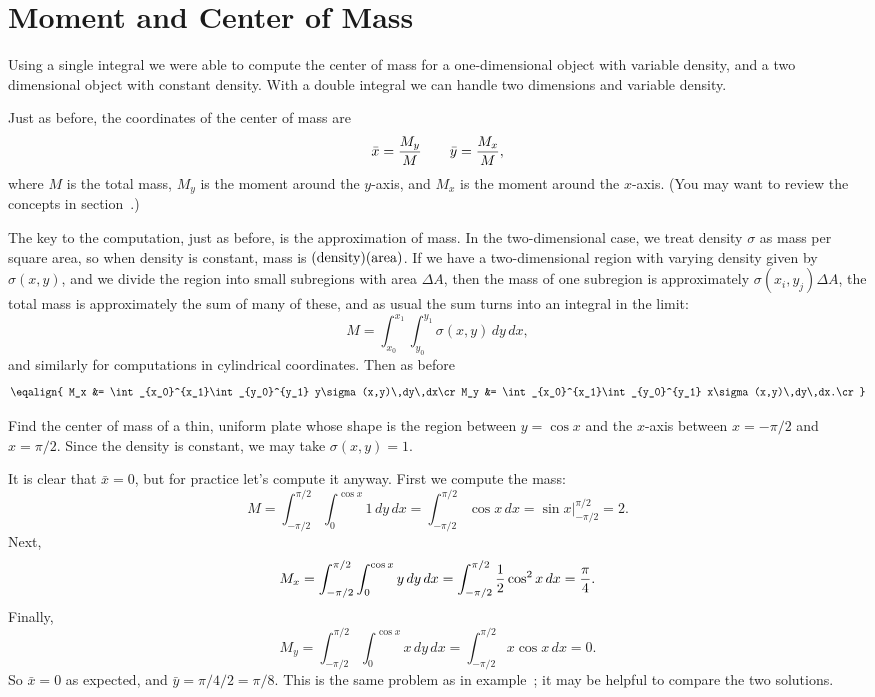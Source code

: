 \section{Moment and Center of Mass}{}{}

Using a single integral we were able to compute the center of mass for
a one-dimensional object with variable density, and a two dimensional
object with constant density. With a double integral we can handle two
dimensions and variable density.

Just as before, the coordinates of the center of mass are
$$\bar x={M_y\over M} \qquad \bar y={M_x\over M},$$
where $M$ is the total mass, $M_y$ is the moment
 around the $y$-axis,
and $M_x$ is the moment around the $x$-axis. (You may want to review
the concepts in section~.) 

The key to the computation, just as before, is the approximation of
mass. In the two-dimensional case, we treat density $\sigma$ as mass
per square area, so when density is constant, mass is 
$(\hbox{density})(\hbox{area})$. If we have a two-dimensional region
with varying density given by $\sigma(x,y)$, and we divide the region
into small subregions with area $\Delta A$, then the mass of one
subregion is approximately $\sigma(x_i,y_j)\Delta A$, the total mass
is approximately the sum of many of these, 
and as usual the sum
turns into an integral in the limit:
$$M=\int_{x_0}^{x_1}\int_{y_0}^{y_1} \sigma(x,y)\,dy\,dx,$$
and similarly for computations in cylindrical coordinates.
Then as before
$$\eqalign{
M_x &= \int_{x_0}^{x_1}\int_{y_0}^{y_1} y\sigma(x,y)\,dy\,dx\cr
M_y &= \int_{x_0}^{x_1}\int_{y_0}^{y_1} x\sigma(x,y)\,dy\,dx.\cr
}$$

\example Find the center of mass of a thin, uniform plate whose shape
is the region between $y=\cos x$ and the $x$-axis between $x=-\pi/2$
and $x=\pi/2$. Since the density is constant, we may take
$\sigma(x,y)=1$. 

It is clear that $\bar x=0$, but for practice let's
compute it anyway. First we compute the mass:
$$
M=\int_{-\pi/2}^{\pi/2} \int_0^{\cos x} 1\,dy\,dx
=\int_{-\pi/2}^{\pi/2} \cos x\,dx
=\left.\sin x\right|_{-\pi/2}^{\pi/2}=2.
$$
Next,
$$
M_x=\int_{-\pi/2}^{\pi/2} \int_0^{\cos x} y\,dy\,dx
=\int_{-\pi/2}^{\pi/2} {1\over2}\cos^2 x\,dx={\pi\over4}.
$$
Finally,
$$
M_y=\int_{-\pi/2}^{\pi/2} \int_0^{\cos x} x\,dy\,dx
=\int_{-\pi/2}^{\pi/2} x\cos x\,dx=0.
$$
So $\bar x=0$ as expected, and $\bar y=\pi/4/2=\pi/8$. 
This is the same problem as in example~; it may be helpful to compare the two solutions.
\endexample

